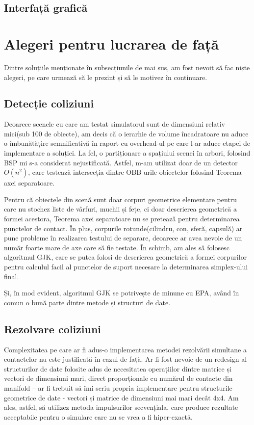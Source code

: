 \documentclass[12pt,a4paper]{report}
\begin{document}
\subsection{Interfață grafică}
\section{Alegeri pentru lucrarea de față}

Dintre soluțiile menționate în subsecțiunile de mai sus, am fost nevoit să fac niște alegeri, pe care urmează să le prezint și să le motivez în continuare.

\subsection{Detecție coliziuni}

Deoarece scenele cu care am testat simulatorul sunt de dimensiuni relativ mici(sub 100 de obiecte), am decis că o ierarhie de volume încadratoare nu aduce o îmbunătățire semnificativă în raport cu overhead-ul pe care l-ar aduce etapei de implementare a soluției. La fel, o partiționare a spațiului scenei în arbori, folosind BSP mi s-a considerat nejustificată. Astfel, m-am utilizat doar de un detector $O(n^2)$, care testează intersecția dintre OBB-urile obiectelor folosind Teorema axei separatoare.

Pentru că obiectele din scenă sunt doar corpuri geometrice elementare pentru care nu stochez liste de vârfuri, muchii și fețe, ci doar descrierea geometrică a formei acestora, Teorema axei separatoare nu se pretează pentru determinarea punctelor de contact. În plus, corpurile rotunde(cilindru, con, sferă, capsulă) ar pune probleme în realizarea testului de separare, deoarece ar avea nevoie de un număr foarte mare de axe care să fie testate. În schimb, am ales să folosesc algoritmul GJK, care se putea folosi de descrierea geometrică a formei corpurilor pentru calculul facil al punctelor de suport necesare la determinarea simplex-ului final.

Și, în mod evident, algoritmul GJK se potrivește de minune cu EPA, având în comun o bună parte dintre metode și structuri de date.

\subsection{Rezolvare coliziuni}

Complexitatea pe care ar fi adus-o implementarea metodei rezolvării simultane a contactelor nu este justificată în cazul de față. Ar fi fost nevoie de un redesign al structurilor de date folosite adus de necesitatea operațiilor dintre matrice și vectori de dimensiuni mari, direct proporționale cu numărul de contacte din manifold -- ar fi trebuit să îmi scriu propria implementare pentru structurile geometrice de date - vectori și matrice de dimensiuni mai mari decât 4x4. Am ales, astfel, să utilizez metoda impulsurilor secvențiala, care produce rezultate acceptabile pentru o simulare care nu se vrea a fi hiper-exactă.
\end{document}
